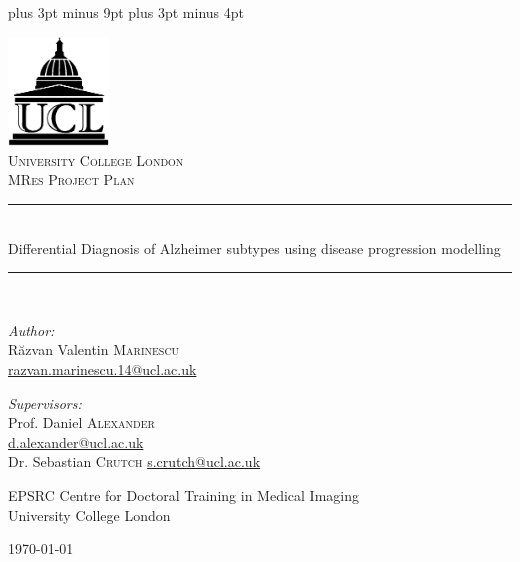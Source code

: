 \documentclass[12pt,a4paper,oneside]{report}
\begin{document}
\belowdisplayskip=12pt plus 3pt minus 9pt
\belowdisplayshortskip=7pt plus 3pt minus 4pt


\begin{titlepage}
\begin{center}

\includegraphics[width=0.2\textwidth]{ucl-logo2}~\\[1cm]

\textsc{\LARGE University College London}\\[1.5cm]

\textsc{\Large MRes Project Plan}\\[0.5cm]

\newcommand{\HRule}{\rule{\linewidth}{0.5mm}}

\HRule \\[0.4cm]
{ \Large Differential Diagnosis of Alzheimer subtypes using disease progression modelling \\[0.4cm] }

\HRule \\[1.5cm]

\begin{minipage}{0.4\textwidth}
\begin{flushleft} \large
\emph{Author:}\\
R\u{a}zvan Valentin \textsc{Marinescu}\\
\href{razvan.marinescu.14@ucl.ac.uk}{razvan.marinescu.14@ucl.ac.uk}\\
\end{flushleft}
\end{minipage}
\begin{minipage}{0.4\textwidth}
\begin{flushright} \large
\emph{Supervisors:} \\
Prof. Daniel \textsc{Alexander}\\
\href{d.alexander@ucl.ac.uk}{d.alexander@ucl.ac.uk}\\[0.5cm]
Dr. Sebastian \textsc{Crutch}
\href{s.crutch@ucl.ac.uk}{s.crutch@ucl.ac.uk}
\end{flushright}
\end{minipage}

\vfill

EPSRC Centre for Doctoral Training in Medical Imaging\\ University College London

\vfill

{\large \today}

\end{center}
\end{titlepage}
\end{document}
